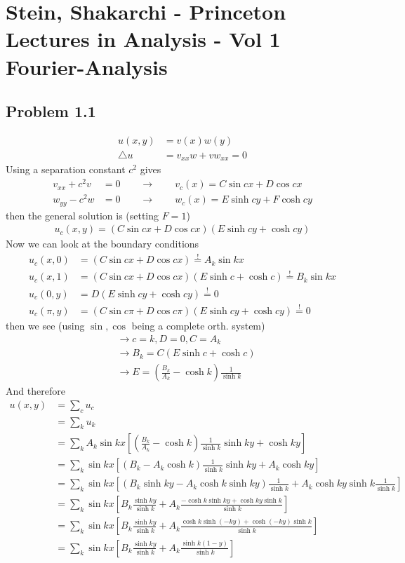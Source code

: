 \documentclass[../main.tex]{subfiles}
\begin{document}
\section{{\sc Stein, Shakarchi} - Princeton Lectures in Analysis - Vol 1 Fourier-Analysis}
\subsection{Problem 1.1}
\begin{align}
u(x,y)&=v(x)w(y)\\
\triangle u&=v_{xx}w+vw_{xx}=0
\end{align}
Using a separation constant $c^2$ gives
\begin{align}
v_{xx}+c^2v&=0\qquad\rightarrow\qquad v_c(x)=C\sin cx+D\cos cx\\
w_{yy}-c^2w&=0\qquad\rightarrow\qquad w_c(x)=E\sinh cy+F\cosh cy
\end{align}
then the general solution is (setting $F=1$)
\begin{align}
u_c(x,y)=(C\sin cx+D\cos cx)(E\sinh cy+\cosh cy)
\end{align}
Now we can look at the boundary conditions
\begin{align}
u_c(x,0)&=(C\sin cx+D\cos cx)\overset{!}{=}A_k\sin kx\\
u_c(x,1)&=(C\sin cx+D\cos cx)(E\sinh c+\cosh c)\overset{!}{=}B_k\sin kx\\
u_c(0,y)&=D(E\sinh cy+\cosh cy)\overset{!}{=}0\\
u_c(\pi,y)&=(C\sin c\pi+D\cos c\pi)(E\sinh cy+\cosh cy)\overset{!}{=}0
\end{align}
then we see (using $\sin,\cos$ being a complete orth. system)
\begin{align}
&\rightarrow c=k, D=0, C=A_k\\
&\rightarrow B_k=C(E\sinh c+\cosh c)\\
&\rightarrow E=\left(\frac{B_k}{A_k}-\cosh k\right)\frac{1}{\sinh k}
\end{align}
And  therefore
\begin{align}
u(x,y)
&=\sum_c u_c\\
&=\sum_k u_k\\
&=\sum_k A_k\sin kx \left[\left(\frac{B_k}{A_k}-\cosh k\right)\frac{1}{\sinh k} \sinh ky+\cosh ky\right]\\
&=\sum_k \sin kx \left[\left(B_k-A_k\cosh k\right)\frac{1}{\sinh k} \sinh ky+A_k\cosh ky\right]\\
&=\sum_k \sin kx \left[\left(B_k\sinh ky-A_k\cosh k\sinh ky\right)\frac{1}{\sinh k} +A_k\cosh ky\sinh k\frac{1}{\sinh k}\right]\\
&=\sum_k \sin kx \left[B_k\frac{\sinh ky}{\sinh k}+A_k\frac{-\cosh k\sinh ky+\cosh ky\sinh k}{\sinh k} \right]\\
&=\sum_k \sin kx \left[B_k\frac{\sinh ky}{\sinh k}+A_k\frac{\cosh k\sinh(-ky)+\cosh(-ky)\sinh k}{\sinh k} \right]\\
&=\sum_k \sin kx \left[B_k\frac{\sinh ky}{\sinh k}+A_k\frac{\sinh k(1-y)}{\sinh k} \right]
\end{align}
\end{document}
